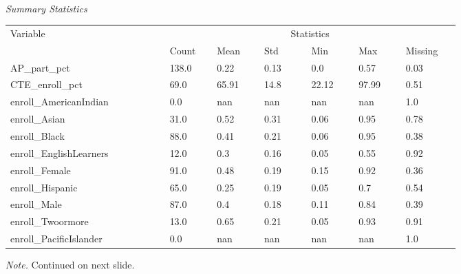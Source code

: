 \documentclass[10pt]{beamer}
\begin{document}
\begin{frame}
    \begin{threeparttable}
        \renewcommand\thetable{2}
        \caption{\\\textit{Summary Statistics}}
        \begin{tabular}{ p{0.27\linewidth} p{0.08\linewidth} p{0.08\linewidth} p{0.08\linewidth} p{0.08\linewidth} p{0.08\linewidth} p{0.09\linewidth}}
            \toprule
            Variable & \multicolumn{6}{c}{Statistics} \\
            \cmidrule(r){2-7}
            &    Count   &   Mean & Std & Min & Max & Missing  \\ 
            \midrule
            AP\_part\_pct &  138.0  &  0.22 & 0.13 & 0.0 & 0.57 & 0.03  \\
            CTE\_enroll\_pct &  69.0  &  65.91 & 14.8 & 22.12 & 97.99 & 0.51  \\ 
            enroll\_AmericanIndian &  0.0  &  nan & nan & nan & nan & 1.0  \\ 
            enroll\_Asian &  31.0  &  0.52 & 0.31 & 0.06 & 0.95 & 0.78  \\ 
            enroll\_Black &  88.0  &  0.41 & 0.21 & 0.06 & 0.95 & 0.38  \\
            enroll\_EnglishLearners &  12.0  &  0.3 & 0.16 & 0.05 & 0.55 & 0.92  \\ 
            enroll\_Female &  91.0  &  0.48 & 0.19 & 0.15 & 0.92 & 0.36  \\ 
            enroll\_Hispanic &  65.0  &  0.25 & 0.19 & 0.05 & 0.7 & 0.54  \\ 
            enroll\_Male &  87.0  &  0.4 & 0.18 & 0.11 & 0.84 & 0.39  \\ 
            enroll\_Twoormore &  13.0  &  0.65 & 0.21 & 0.05 & 0.93 & 0.91  \\ 
            enroll\_PacificIslander &  0.0  &  nan & nan & nan & nan & 1.0  \\
            \midrule
        \end{tabular}
        \small \emph{Note.} Continued on next slide.
        \end{threeparttable}
\end{frame}
\end{document}
